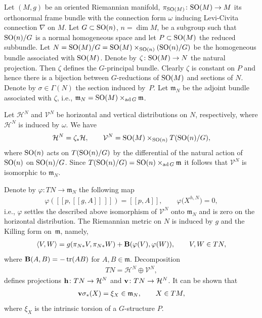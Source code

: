 \documentclass[10pt,a4paper]{amsart}
\numberwithin{equation}{section}
\newcommand{\skal}[2]{\langle #1,#2\rangle}
\begin{document}
Let $(M,g)$ be an oriented Riemannian manifold, $\pi_{{\rm SO}(M)}\colon {\rm SO}(M)\to M$ its orthonormal frame bundle with the connection form $\omega$ inducing Levi-Civita connection $\nabla$ on $M$. Let $G\subset {\rm SO}(n)$, $n=\dim M$, be a subgroup such that ${\rm SO}(n)/G$ is a normal homogeneous space and let $P\subset {\rm SO}(M)$ the reduced subbundle. Let $N={\rm SO}(M)/G={\rm SO}(M)\times_{{\rm SO}(n)} ({\rm SO}(n)/G)$ be the homogeneous bundle associated with ${\rm SO}(M)$. Denote by $\zeta\colon {\rm SO}(M)\to N$ the natural projection. Then $\zeta$ def\/ines the $G$-principal bundle. Clearly $\zeta$ is constant on $P$ and hence there is a bijection between $G$-reductions of ${\rm SO}(M)$ and sections of $N$. Denote by $\sigma\in \Gamma(N)$ the section induced by~$P$. Let $\mathfrak{m}_N$ be the adjoint bundle associated with $\zeta$, i.e., $\mathfrak{m}_N={\rm SO}(M)\times_{\operatorname{ad}G}\mathfrak{m}$.

Let $\mathcal{H}^N$ and $\mathcal{V}^N$ be horizontal and vertical distributions on $N$, respectively, where $\mathcal{H}^N$ is induced by $\omega$. We have
\begin{gather*}
\mathcal{H}^N=\zeta_{\ast}\mathcal{H},\qquad \mathcal{V}^N={\rm SO}(M)\times_{{\rm SO}(n)} T({\rm SO}(n)/G),
\end{gather*}
where ${\rm SO}(n)$ acts on $T({\rm SO}(n)/G)$ by the dif\/ferential of the natural action of ${\rm SO}(n)$ on ${\rm SO}(n)/G$. Since $T({\rm SO}(n)/G)={\rm SO}(n)\times_{\operatorname{ad}G}\mathfrak{m}$ it follows that $\mathcal{V}^N$ is isomorphic to $\mathfrak{m}_N$.

Denote by $\varphi\colon TN\to \mathfrak{m}_N$ the following map
\begin{gather*}
\varphi([[p,[[g,A]]\,]])=[[p,A]],\qquad \varphi\big(X^{h,N}\big)=0,
\end{gather*}
i.e., $\varphi$ settles the described above isomorphism of $\mathcal{V}^N$ onto $\mathfrak{m}_N$ and is zero on the horizontal distribution. The Riemannian metric on $N$ is induced by $g$ and the Killing form on~$\mathfrak{m}$, namely,
\begin{gather}\label{eq:riemmetriconN}
\skal{V}{W}=g(\pi_{N\ast}V,\pi_{N\ast}W)+{\bf B}(\varphi(V),\varphi(W)),\qquad V,W\in TN,
\end{gather}
where ${\bf B}(A,B)=-\operatorname{tr}(AB)$ for $A,B\in\mathfrak{m}$. Decomposition
\begin{gather*}
TN=\mathcal{H}^N\oplus\mathcal{V}^N,
\end{gather*}
def\/ines projections ${\bf h}\colon TN\to\mathcal{H}^N$ and ${\bf v}\colon TN\to\mathcal{H}^N$. It can be shown that~\cite{gmc2}
\begin{gather}\label{eq:verticalsigma}
{\bf v}\sigma_{\ast}(X)=\xi_X\in\mathfrak{m}_N,\qquad X\in TM,
\end{gather}
where $\xi_X$ is the intrinsic torsion of a $G$-structure $P$.
\end{document}

